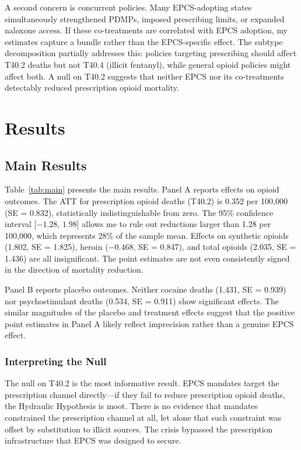 \documentclass[12pt]{article}
\begin{document}
A second concern is concurrent policies. Many EPCS-adopting states simultaneously strengthened PDMPs, imposed prescribing limits, or expanded naloxone access. If these co-treatments are correlated with EPCS adoption, my estimates capture a bundle rather than the EPCS-specific effect. The subtype decomposition partially addresses this: policies targeting prescribing should affect T40.2 deaths but not T40.4 (illicit fentanyl), while general opioid policies might affect both. A null on T40.2 suggests that neither EPCS nor its co-treatments detectably reduced prescription opioid mortality.

\section{Results}

\subsection{Main Results}



Table~\ref{tab:main} presents the main results. Panel A reports effects on opioid outcomes. The ATT for prescription opioid deaths (T40.2) is 0.352 per 100,000 (SE = 0.832), statistically indistinguishable from zero. The 95\% confidence interval [$-1.28$, $1.98$] allows me to rule out reductions larger than 1.28 per 100,000, which represents 28\% of the sample mean. Effects on synthetic opioids (1.802, SE = 1.825), heroin ($-0.468$, SE = 0.847), and total opioids (2.035, SE = 1.436) are all insignificant. The point estimates are not even consistently signed in the direction of mortality reduction.

Panel B reports placebo outcomes. Neither cocaine deaths (1.431, SE = 0.939) nor psychostimulant deaths (0.534, SE = 0.911) show significant effects. The similar magnitudes of the placebo and treatment effects suggest that the positive point estimates in Panel A likely reflect imprecision rather than a genuine EPCS effect.

\subsubsection*{Interpreting the Null} The null on T40.2 is the most informative result. EPCS mandates target the prescription channel directly---if they fail to reduce prescription opioid deaths, the Hydraulic Hypothesis is moot. There is no evidence that mandates constrained the prescription channel at all, let alone that such constraint was offset by substitution to illicit sources. The crisis bypassed the prescription infrastructure that EPCS was designed to secure.
\end{document}

